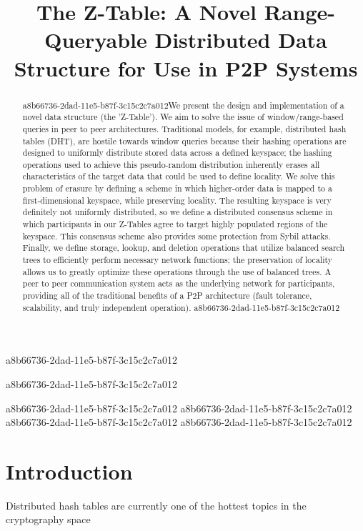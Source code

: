 \documentclass[12pt]{article}
\title{The Z-Table: A Novel Range-Queryable Distributed Data Structure for Use in P2P Systems}
\begin{document}
a8b66736-2dad-11e5-b87f-3c15c2c7a012
\maketitle
a8b66736-2dad-11e5-b87f-3c15c2c7a012
\begin{abstract}
a8b66736-2dad-11e5-b87f-3c15c2c7a012We present the design and implementation of a novel data structure (the 'Z-Table'). We aim to solve the issue of window/range-based queries in peer to peer architectures. Traditional models, for example,  distributed hash tables (DHT), are hostile towards window queries because their hashing operations are designed to uniformly distribute stored data across a defined keyspace; the hashing operations used to achieve this pseudo-random distribution inherently erases all characteristics of the target data that could be used to define locality. We solve this problem of erasure by defining a scheme in which higher-order data is mapped to a first-dimensional keyspace, while preserving locality. The resulting keyspace is very definitely not uniformly distributed, so we define a distributed consensus scheme in which participants in our Z-Tables agree to target highly populated regions of the keyspace. This consensus scheme also provides some protection from Sybil attacks. Finally, we define storage, lookup, and deletion operations that utilize balanced search trees to efficiently perform necessary network functions; the preservation of locality allows us to greatly optimize these operations through the use of balanced trees. A peer to peer communication system acts as the underlying network for participants, providing all of the traditional benefits of a P2P architecture (fault tolerance, scalability, and truly independent operation).
a8b66736-2dad-11e5-b87f-3c15c2c7a012\end{abstract}
a8b66736-2dad-11e5-b87f-3c15c2c7a012
a8b66736-2dad-11e5-b87f-3c15c2c7a012
a8b66736-2dad-11e5-b87f-3c15c2c7a012\newpage
a8b66736-2dad-11e5-b87f-3c15c2c7a012\section{Introduction}
Distributed hash tables are currently one of the hottest topics in the cryptography space~\cite{Stoica:2001dj,Rowstron:2001ea,Ratnasamy:2001wn}

\printbibliography
\end{document}

